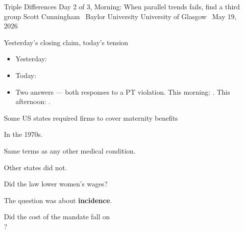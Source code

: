 \documentclass[aspectratio=169,11pt]{beamer}
\begin{document}

\remixtitleframe
  {Triple Differences}
  {Day 2 of 3, Morning: When parallel trends fails, find a third group}
  {Scott Cunningham \textperiodcentered\ Baylor University}
  {University of Glasgow \textperiodcentered\ May 19, 2026}

\begin{frame}{Yesterday's closing claim, today's tension}
\vspace{0.6em}
\vspace{0.6em}
\begin{itemize}
  \item Yesterday: 
  \item Today: 
  \item Two answers --- both responses to a PT violation. This morning: . This afternoon: .
\end{itemize}
\end{frame}

\begin{frame}{Some US states required firms to cover maternity benefits}
\vspace{1.2em}
\begin{center}
\large In the 1970s.
\end{center}
\vspace{0.6em}
\begin{center}
\large Same terms as any other medical condition.
\end{center}
\vspace{0.6em}
\begin{center}
\large Other states did not.
\end{center}
\end{frame}

\begin{frame}{Did the law lower women's wages?}
\vspace{2em}
\begin{center}
\large
The question was about \textbf{incidence}.
\end{center}
\vspace{0.6em}
\begin{center}
\large
Did the cost of the mandate fall on \\[0.2em]
?
\end{center}
\end{frame}
\end{document}
